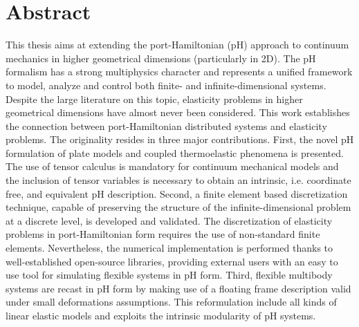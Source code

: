 \chapter*{Abstract}

This thesis aims at extending the port-Hamiltonian (pH) approach to continuum mechanics in higher geometrical dimensions (particularly in 2D). The pH formalism has a strong multiphysics character and represents a unified framework to model, analyze and control both finite- and infinite-dimensional systems. Despite the large literature on this topic, elasticity problems in higher geometrical dimensions have almost never been considered.  This work establishes the connection between port-Hamiltonian distributed systems and elasticity problems. The originality resides in three major contributions. First, the novel pH formulation of plate models and coupled thermoelastic phenomena is presented. The use of tensor calculus is mandatory for continuum mechanical models and the inclusion of tensor variables is necessary to obtain an intrinsic, i.e. coordinate free, and equivalent pH description. Second, a finite element based discretization technique, capable of preserving the structure of the infinite-dimensional problem at a discrete level, is developed and validated. The discretization of elasticity problems in port-Hamiltonian form requires the use of non-standard finite elements. Nevertheless, the numerical implementation is performed thanks to well-established open-source libraries, providing external users with an easy to use tool for simulating flexible systems in pH form. Third, flexible multibody systems are recast in pH form by making use of a floating frame description valid under small deformations assumptions. This reformulation include all kinds of linear elastic models and exploits the intrinsic modularity of pH systems. 